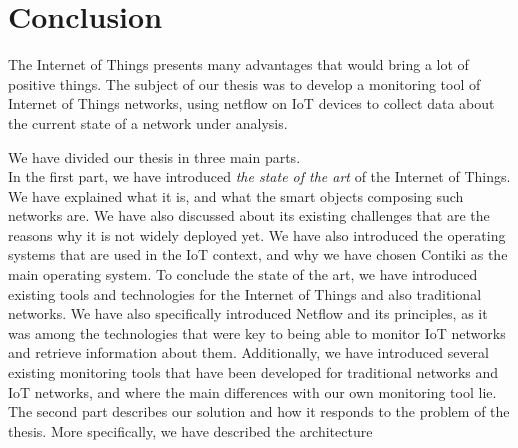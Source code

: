 \chapter*{Conclusion}

The Internet of Things presents many advantages that would bring a lot of positive things. The subject of our thesis was to develop a monitoring tool of Internet of Things networks, using netflow on IoT devices to collect data about the current state of a network under analysis.

We have divided our thesis in three main parts. \\

In the first part, we have introduced \textit{the state of the art} of the Internet of Things. We have explained what it is, and what the smart objects composing such networks are. We have also discussed about its existing challenges that are the reasons why it is not widely deployed yet. We have also introduced the operating systems that are used in the IoT context, and why we have chosen Contiki as the main operating system. To conclude the state of the art, we have introduced existing tools and technologies for the Internet of Things and also traditional networks. We have also specifically introduced Netflow and its principles, as it was among the technologies that were key to being able to monitor IoT networks and retrieve information about them. Additionally, we have introduced several existing monitoring tools that have been developed for traditional networks and IoT networks, and where the main differences with our own monitoring tool lie.\\

The second part describes our solution and how it responds to the problem of the thesis. More specifically, we have described the architecture 
